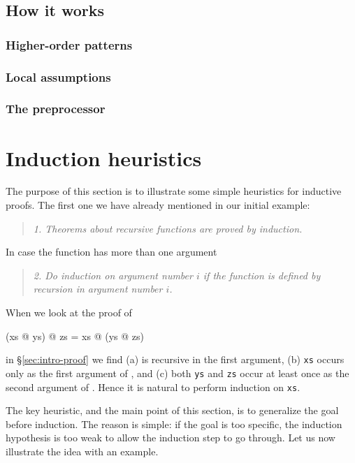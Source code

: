 \subsection{How it works}
\label{sec:SimpHow}

\subsubsection{Higher-order patterns}

\subsubsection{Local assumptions}

\subsubsection{The preprocessor}

\section{Induction heuristics}
\label{sec:InductionHeuristics}

The purpose of this section is to illustrate some simple heuristics for
inductive proofs. The first one we have already mentioned in our initial
example:
\begin{quote}
{\em 1. Theorems about recursive functions are proved by induction.}
\end{quote}
In case the function has more than one argument
\begin{quote}
{\em 2. Do induction on argument number $i$ if the function is defined by
recursion in argument number $i$.}
\end{quote}
When we look at the proof of
\begin{ttbox}\makeatother
(xs @ ys) @ zs = xs @ (ys @ zs)
\end{ttbox}
in \S\ref{sec:intro-proof} we find (a) \texttt{\at} is recursive in the first
argument, (b) \texttt{xs} occurs only as the first argument of \texttt{\at},
and (c) both \texttt{ys} and \texttt{zs} occur at least once as the second
argument of \texttt{\at}. Hence it is natural to perform induction on
\texttt{xs}.

The key heuristic, and the main point of this section, is to
generalize the goal before induction. The reason is simple: if the goal is
too specific, the induction hypothesis is too weak to allow the induction
step to go through. Let us now illustrate the idea with an example.

